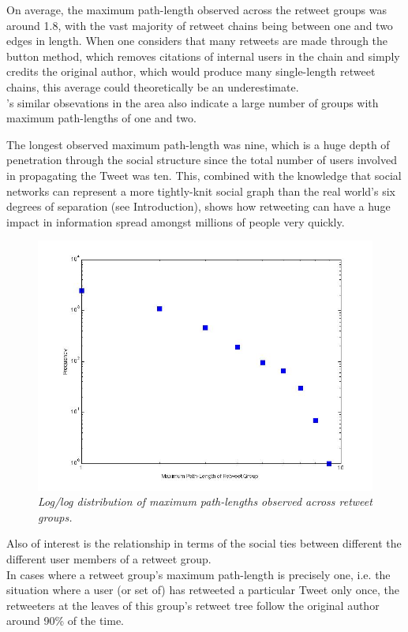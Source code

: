 On average, the maximum path-length observed across the retweet groups was around 1.8, with the vast majority of retweet chains being between one and two edges in length. When one considers that many retweets are made through the button method, which removes citations of internal users in the chain and simply credits the original author, which would produce many single-length retweet chains, this average could theoretically be an underestimate.\\
\cite{kwak10}'s similar obsevations in the area also indicate a large number of groups with maximum path-lengths of one and two.

The longest observed maximum path-length was nine, which is a huge depth of penetration through the social structure since the total number of users involved in propagating the Tweet was ten. This, combined with the knowledge that social networks can represent a more tightly-knit social graph than the real world's six degrees of separation (see Introduction), shows how retweeting can have a huge impact in information spread amongst millions of people very quickly.

\begin{figure}[h]
\centering
\includegraphics[scale=0.35]{3.Chapter1/Media/pathlength-distribution.jpg} 
\caption{\textit{Log/log distribution of maximum path-lengths observed across retweet groups.}}
\label{fig:pathlength-distribution}
\end{figure}

Also of interest is the relationship in terms of the social ties between different the different user members of a retweet group.\\
In cases where a retweet group's maximum path-length is precisely one, i.e. the situation where a user (or set of) has retweeted a particular Tweet only once, the retweeters at the leaves of this group's retweet tree follow the original author around 90\% of the time.

